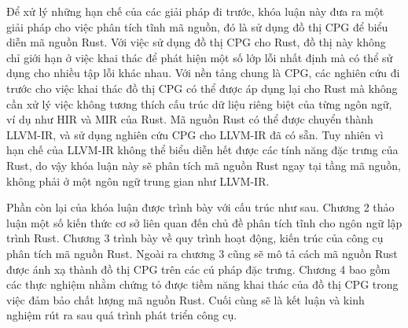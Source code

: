 
Để xử lý những hạn chế của các giải pháp đi trước, khóa luận này đưa ra một giải pháp cho việc phân tích tĩnh mã nguồn, đó là sử dụng đồ thị CPG để biểu diễn mã nguồn Rust.
Với việc sử dụng đồ thị CPG cho Rust, đồ thị này không chỉ giới hạn ở việc khai thác để phát hiện một số lớp lỗi nhất định mà có thể sử dụng cho nhiều tập lỗi khác nhau.
Với nền tảng chung là CPG, các nghiên cứu đi trước cho việc khai thác đồ thị CPG có thể được áp dụng lại cho Rust mà không cần xử lý việc không tương thích cấu trúc dữ liệu riêng biệt của từng ngôn ngữ, ví dụ như HIR và MIR của Rust.
Mã nguồn Rust có thể được chuyển thành LLVM-IR, và sử dụng nghiên cứu CPG cho LLVM-IR đã có sẵn.
Tuy nhiên vì hạn chế của LLVM-IR không thể biểu diễn hết được các tính năng đặc trưng của Rust, do vậy khóa luận này sẽ phân tích mã nguồn Rust ngay tại tầng mã nguồn, không phải ở một ngôn ngữ trung gian như LLVM-IR.

Phần còn lại của khóa luận được trình bày với cấu trúc như sau.
Chương 2 thảo luận một số kiến thức cơ sở liên quan đến chủ đề phân tích tĩnh cho ngôn ngữ lập trình Rust.
Chương 3 trình bày về quy trình hoạt động, kiến trúc của công cụ phân tích mã nguồn Rust.
Ngoài ra chương 3 cũng sẽ mô tả cách mã nguồn Rust được ánh xạ thành đồ thị CPG trên các cú pháp đặc trưng.
Chương 4 bao gồm các thực nghiệm nhằm chứng tỏ được tiềm năng khai thác của đồ thị CPG trong việc đảm bảo chất lượng mã nguồn Rust.
Cuối cùng sẽ là kết luận và kinh nghiệm rút ra sau quá trình phát triển công cụ.
